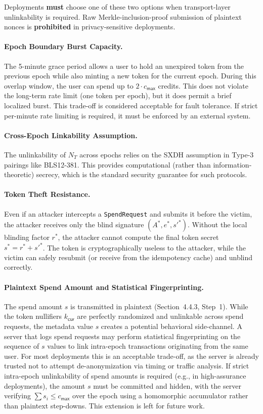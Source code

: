 \documentclass[11pt]{article}
\theoremstyle{definitionstyle}
\theoremstyle{plain}
\begin{document}
Deployments \textbf{must} choose one of these two options when transport-layer unlinkability is required. Raw Merkle-inclusion-proof submission of plaintext nonces is \textbf{prohibited} in privacy-sensitive deployments.

\paragraph{Epoch Boundary Burst Capacity.}
The 5-minute grace period allows a user to hold an unexpired token from the previous epoch while also minting a new token for the current epoch. During this overlap window, the user can spend up to $2 \cdot c_{\mathsf{max}}$ credits. This does not violate the long-term rate limit (one token per epoch), but it does permit a brief localized burst. This trade-off is considered acceptable for fault tolerance. If strict per-minute rate limiting is required, it must be enforced by an external system.

\paragraph{Cross-Epoch Linkability Assumption.}
The unlinkability of $N_T$ across epochs relies on the SXDH assumption in Type-3 pairings like BLS12-381. This provides computational (rather than information-theoretic) secrecy, which is the standard security guarantee for such protocols.

\paragraph{Token Theft Resistance.}
Even if an attacker intercepts a \texttt{SpendRequest} and submits it before the victim, the attacker receives only the blind signature $(A^*, e^*, s'^*)$. Without the local blinding factor $r^*$, the attacker cannot compute the final token secret $s^* = r^* + s'^*$. The token is cryptographically useless to the attacker, while the victim can safely resubmit (or receive from the idempotency cache) and unblind correctly.

\paragraph{Plaintext Spend Amount and Statistical Fingerprinting.}
The spend amount $s$ is transmitted in plaintext (Section~4.4.3, Step~1). While the token nullifiers $k_{\mathsf{cur}}$ are perfectly randomized and unlinkable across spend requests, the metadata value $s$ creates a potential behavioral side-channel. A server that logs spend requests may perform statistical fingerprinting on the sequence of $s$ values to link intra-epoch transactions originating from the same user. For most deployments this is an acceptable trade-off, as the server is already trusted not to attempt de-anonymization via timing or traffic analysis. If strict intra-epoch unlinkability of spend amounts is required (e.g., in high-assurance deployments), the amount $s$ must be committed and hidden, with the server verifying $\sum s_i \le c_{\mathsf{max}}$ over the epoch using a homomorphic accumulator rather than plaintext step-downs. This extension is left for future work.
\end{document}
